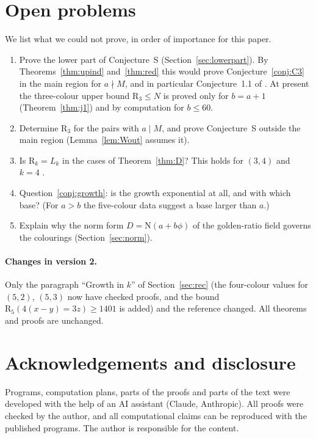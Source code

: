 \documentclass[11pt,a4paper]{article}
\theoremstyle{definition}
\theoremstyle{remark}
\newcommand{\R}{\mathrm{R}}
\begin{document}
\section{Open problems}\label{sec:open}
We list what we could not prove, in order of importance for this paper.
\begin{enumerate}
\item Prove the lower part of Conjecture~S (Section~\ref{sec:lowerpart}). By Theorems~\ref{thm:upind} and~\ref{thm:red} this would prove Conjecture~\ref{conj:C3} in the main region for $a\nmid M$, and in particular Conjecture~1.1 of \cite{AZB25}. At present the three-colour upper bound $\R_3\le N$ is proved only for $b=a+1$ (Theorem~\ref{thm:j1}) and by computation for $b\le60$.
\item Determine $\R_3$ for the pairs with $a\mid M$, and prove Conjecture~S outside the main region (Lemma~\ref{lem:Wout} assumes it).
\item Is $\R_k=L_k$ in the cases of Theorem~\ref{thm:D}? This holds for $(3,4)$ and $k=4$ \cite{Ich26b}.
\item Question~\ref{conj:growth}: is the growth exponential at all, and with which base? (For $a>b$ the five-colour data suggest a base larger than $a$.)
\item Explain why the norm form $D=\mathrm N(a+b\phi)$ of the golden-ratio field governs the colourings (Section~\ref{sec:norm}).
\end{enumerate}

\paragraph{Changes in version 2.} Only the paragraph ``Growth in $k$'' of Section~\ref{sec:rec} (the four-colour values for $(5,2)$, $(5,3)$ now have checked proofs, and the bound $\R_5(4(x-y)=3z)\ge1401$ is added) and the reference \cite{Ich26b} changed. All theorems and proofs are unchanged.

\section*{Acknowledgements and disclosure}
Programs, computation plans, parts of the proofs and parts of the text were developed with the help of an AI assistant (Claude, Anthropic). All proofs were checked by the author, and all computational claims can be reproduced with the published programs. The author is responsible for the content.
\end{document}
